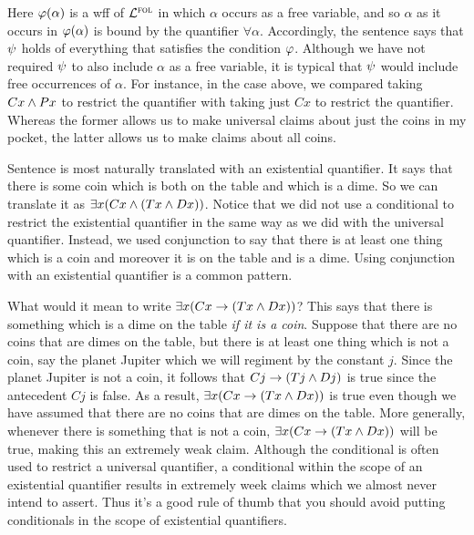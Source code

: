 Here $\varphi(\alpha)$ is a wff of $\mathcal{L}^{\textsc{fol}}$ in which $\alpha$ occurs as a free variable, and so $\alpha$ as it occurs in $\varphi(\alpha)$ is bound by the quantifier $\forall\alpha$.
Accordingly, the sentence  says that $\psi$ holds of everything that satisfies the condition $\varphi$.
Although we have not required $\psi$ to also include $\alpha$ as a free variable, it is typical that $\psi$ would include free occurrences of $\alpha$.
For instance, in the case above, we compared taking $Cx \wedge Px$ to restrict the quantifier with taking just $Cx$ to restrict the quantifier. 
Whereas the former allows us to make universal claims about just the coins in my pocket, the latter allows us to make claims about all coins.

Sentence  is most naturally translated with an existential quantifier.
It says that there is some coin which is both on the table and which is a dime.
So we can translate it as $\exists x(Cx \wedge (Tx \wedge Dx))$.
Notice that we did not use a conditional to restrict the existential quantifier in the same way as we did with the universal quantifier.
Instead, we used conjunction to say that there is at least one thing which is a coin and moreover it is on the table and is a dime.
Using conjunction with an existential quantifier is a common pattern.

What would it mean to write $\exists x(Cx \rightarrow (Tx \wedge Dx))$?
This says that there is something which is a dime on the table \textit{if it is a coin}.
Suppose that there are no coins that are dimes on the table, but there is at least one thing which is not a coin, say the planet Jupiter which we will regiment by the constant $j$.
Since the planet Jupiter is not a coin, it follows that $Cj \rightarrow (Tj \wedge Dj)$ is true since the antecedent $Cj$ is false. 
As a result, $\exists x(Cx \rightarrow (Tx \wedge Dx))$ is true even though we have assumed that there are no coins that are dimes on the table.
More generally, whenever there is something that is not a coin, $\exists x(Cx \rightarrow (Tx \wedge Dx))$ will be true, making this an extremely weak claim.
Although the conditional is often used to restrict a universal quantifier, a conditional within the scope of an existential quantifier results in extremely week claims which we almost never intend to assert.
Thus it's a good rule of thumb that you should avoid putting conditionals in the scope of existential quantifiers.

